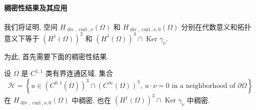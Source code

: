 \paragraph{稠密性结果及其应用}

我们将证明, 空间 $H_{\operatorname{div},\operatorname{curl},\nu}(\Omega)$ 和
$H_{\operatorname{div},\operatorname{curl},\nu,0}(\Omega)$ 分别在代数意义和拓扑意义下等于
$(H^1(\Omega))^3$ 和 $(H^1(\Omega))^3\cap\operatorname{Ker}\gamma_\nu$.

为此, 首先需要下面的稠密性结果.

\begin{Theorem}
\label{thm:chap4-density-hdivcurlnu}
设 $\Omega$ 是 $C^{1,1}$ 类有界连通区域. 集合
\[
 \mathcal H=\left\{u\in(C^{0,1}(\overline\Omega))^3\cap(C^\infty(\Omega))^3,
 \ u\cdot\nu=0\text{ in a neighborhood of }\partial\Omega\right\}
\]
在 $H_{\operatorname{div},\operatorname{curl},\nu,0}(\Omega)$ 中稠密, 也在
$(H^1(\Omega))^3\cap\operatorname{Ker}\gamma_\nu$ 中稠密.
\end{Theorem}

